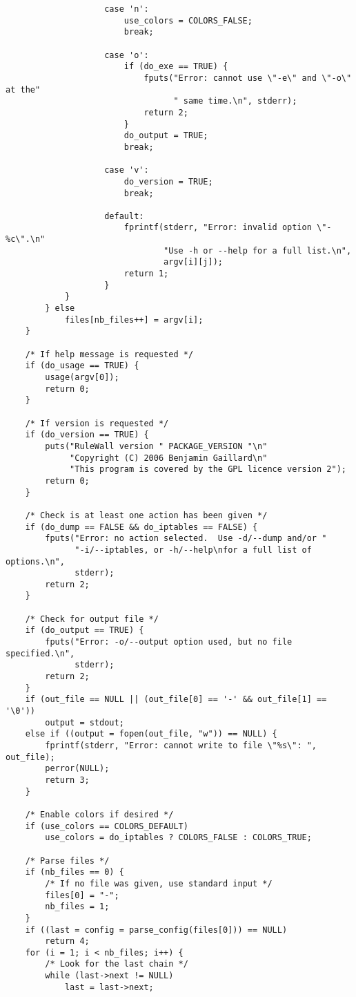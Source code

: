 \documentclass[a4paper,landscape,twocolumn,11pt]{article}
\begin{document}
\begin{lstlisting}
                    case 'n':
                        use_colors = COLORS_FALSE;
                        break;

                    case 'o':
                        if (do_exe == TRUE) {
                            fputs("Error: cannot use \"-e\" and \"-o\" at the"
                                  " same time.\n", stderr);
                            return 2;
                        }
                        do_output = TRUE;
                        break;

                    case 'v':
                        do_version = TRUE;
                        break;

                    default:
                        fprintf(stderr, "Error: invalid option \"-%c\".\n"
                                "Use -h or --help for a full list.\n",
                                argv[i][j]);
                        return 1;
                    }
            }
        } else
            files[nb_files++] = argv[i];
    }

    /* If help message is requested */
    if (do_usage == TRUE) {
        usage(argv[0]);
        return 0;
    }

    /* If version is requested */
    if (do_version == TRUE) {
        puts("RuleWall version " PACKAGE_VERSION "\n"
             "Copyright (C) 2006 Benjamin Gaillard\n"
             "This program is covered by the GPL licence version 2");
        return 0;
    }

    /* Check is at least one action has been given */
    if (do_dump == FALSE && do_iptables == FALSE) {
        fputs("Error: no action selected.  Use -d/--dump and/or "
              "-i/--iptables, or -h/--help\nfor a full list of options.\n",
              stderr);
        return 2;
    }

    /* Check for output file */
    if (do_output == TRUE) {
        fputs("Error: -o/--output option used, but no file specified.\n",
              stderr);
        return 2;
    }
    if (out_file == NULL || (out_file[0] == '-' && out_file[1] == '\0'))
        output = stdout;
    else if ((output = fopen(out_file, "w")) == NULL) {
        fprintf(stderr, "Error: cannot write to file \"%s\": ", out_file);
        perror(NULL);
        return 3;
    }

    /* Enable colors if desired */
    if (use_colors == COLORS_DEFAULT)
        use_colors = do_iptables ? COLORS_FALSE : COLORS_TRUE;

    /* Parse files */
    if (nb_files == 0) {
        /* If no file was given, use standard input */
        files[0] = "-";
        nb_files = 1;
    }
    if ((last = config = parse_config(files[0])) == NULL)
        return 4;
    for (i = 1; i < nb_files; i++) {
        /* Look for the last chain */
        while (last->next != NULL)
            last = last->next;


\end{lstlisting}
\end{document}
